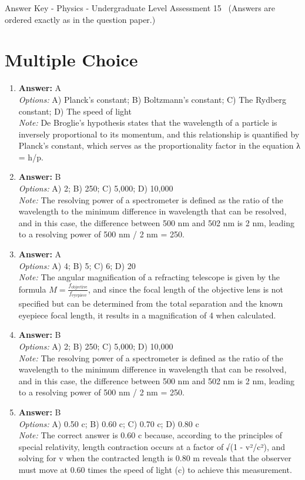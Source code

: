 \documentclass[12pt]{article}
\begin{document}
\begin{center}
Answer Key - Physics - Undergraduate Level Assessment 15 \
\small (Answers are ordered exactly as in the question paper.)
\end{center}

\section*{Multiple Choice}
\begin{enumerate}[label=\arabic*.]
\item \textbf{Answer:} A
\\ \textit{Options:} A) Planck's constant; B) Boltzmann's constant; C) The Rydberg constant; D) The speed of light
\\ \textit{Note:} De Broglie's hypothesis states that the wavelength of a particle is inversely proportional to its momentum, and this relationship is quantified by Planck's constant, which serves as the proportionality factor in the equation λ = h/p.
\item \textbf{Answer:} B
\\ \textit{Options:} A) 2; B) 250; C) 5,000; D) 10,000
\\ \textit{Note:} The resolving power of a spectrometer is defined as the ratio of the wavelength to the minimum difference in wavelength that can be resolved, and in this case, the difference between 500 nm and 502 nm is 2 nm, leading to a resolving power of 500 nm / 2 nm = 250.
\item \textbf{Answer:} A
\\ \textit{Options:} A) 4; B) 5; C) 6; D) 20
\\ \textit{Note:} The angular magnification of a refracting telescope is given by the formula \( M = \frac{f_{\text{objective}}}{f_{\text{eyepiece}}} \), and since the focal length of the objective lens is not specified but can be determined from the total separation and the known eyepiece focal length, it results in a magnification of 4 when calculated.
\item \textbf{Answer:} B
\\ \textit{Options:} A) 2; B) 250; C) 5,000; D) 10,000
\\ \textit{Note:} The resolving power of a spectrometer is defined as the ratio of the wavelength to the minimum difference in wavelength that can be resolved, and in this case, the difference between 500 nm and 502 nm is 2 nm, leading to a resolving power of 500 nm / 2 nm = 250.
\item \textbf{Answer:} B
\\ \textit{Options:} A) 0.50 c; B) 0.60 c; C) 0.70 c; D) 0.80 c
\\ \textit{Note:} The correct answer is 0.60 c because, according to the principles of special relativity, length contraction occurs at a factor of √(1 - v²/c²), and solving for v when the contracted length is 0.80 m reveals that the observer must move at 0.60 times the speed of light (c) to achieve this measurement.
\end{enumerate}
\end{document}
